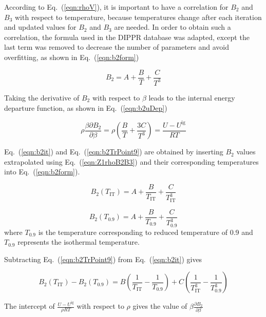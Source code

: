 \documentclass[%
 aip,
 jcp,
 sd,%
 amsmath,amssymb,
 reprint,%
]{revtex4-1}
\begin{document}
According to Eq.~(\ref{eqn:rhoV}), it is important to have a correlation for $B_2$ and $B_3$ with respect to temperature, because temperatures change after each iteration and updated values for $B_2$ and $B_3$ are needed. In order to obtain such a correlation, the formula used in the DIPPR \cite{DIPPR2004} database was adapted, except the last term was removed to decrease the number of parameters and avoid overfitting, as shown in Eq.~(\ref{eqn:b2form}) 

\begin{equation}
B_2=A+\frac{B}{T}+\frac{C}{T^3} \label{eqn:b2form}
\end{equation}

Taking the derivative of $B_2$ with respect to $\beta$ leads to the internal energy departure function, as shown in  Eq.~(\ref{eqn:b2uDep})

\begin{equation}
\rho \frac{\beta \partial B_2}{\partial \beta}=\rho \left( \frac{B}{T}+\frac{3C}{T^3}\right)=\frac{U-U^{\mathrm{ig}}}{RT} \label{eqn:b2uDep}
\end{equation}

Eq.~(\ref{eqn:b2it}) and Eq.~(\ref{eqn:b2TrPoint9}) are obtained by inserting $B_2$ values extrapolated using Eq.~(\ref{eqn:Z1rhoB2B3}) and their corresponding temperatures into Eq.~(\ref{eqn:b2form}). 

\begin{equation}
B_2(T_{\mathrm{IT}})=A+\frac{B}{T_{\mathrm{IT}}}+\frac{C}{T_{\mathrm{IT}}^3} \label{eqn:b2it}
\end{equation}

\begin{equation}
B_2(T_{0.9})=A+\frac{B}{T_{0.9}}+\frac{C}{T_{0.9}^3} \label{eqn:b2TrPoint9}
\end{equation}
where $T_{0.9}$ is the temperature corresponding to reduced temperature of 0.9 and $T_{0.9}$ represents the isothermal temperature. 

Subtracting Eq.~(\ref{eqn:b2TrPoint9}) from Eq.~(\ref{eqn:b2it}) gives


\begin{equation}
B_2(T_{\mathrm{IT}})-B_2(T_{0.9})=B \left( \frac{1}{T_{\mathrm{IT}}}-\frac{1}{T_{0.9}} \right) +C \left( \frac{1}{T_{\mathrm{IT}}^3}-\frac{1}{T_{0.9}^3} \right) \label{eqn:b2subtract}
\end{equation}

The intercept of $\frac{U-U^{\mathrm{ig}}}{\rho RT}$ with respect to $\rho$ gives the value of $\beta \frac{\partial B_2}{\partial \beta}$
\end{document}
